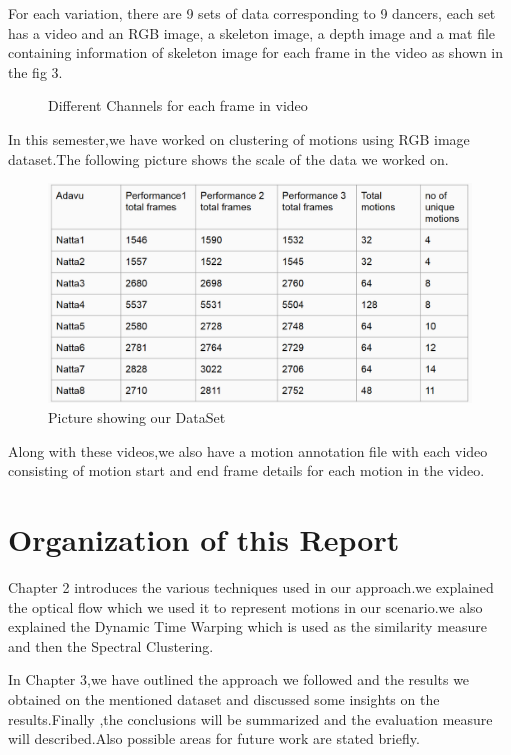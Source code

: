 For each variation, there are 9 sets of data corresponding to 9 dancers, each set has a video and an RGB image, a skeleton image, a depth image and a mat file containing information of skeleton image for each frame in the video as shown in the fig 3.

\begin{figure} [!htbp]
\centering    
{}
\caption{Different Channels for each frame in video}
\end{figure}


In this semester,we have worked on clustering of motions using RGB image dataset.The following picture shows the scale of the data we worked on.



\begin{figure} [!htbp]
\centering
\includegraphics[width=120mm]{Pictures/data.png}
\caption{Picture showing our DataSet}
\end{figure}


Along with these videos,we also have a motion annotation file with each video consisting of motion start and end frame details for each motion in the video.  

\section{Organization of this Report}

Chapter 2 introduces the various techniques used in our approach.we explained the optical flow which we used it to represent motions in our scenario.we also explained the Dynamic Time Warping which is used as the similarity measure and then the Spectral Clustering.

In Chapter 3,we have outlined the approach we followed and the results we obtained on the mentioned dataset and discussed some insights on the results.Finally ,the conclusions will be summarized and the evaluation measure will described.Also possible areas for future work are stated briefly.